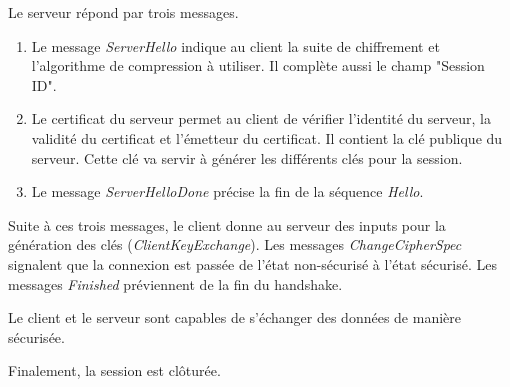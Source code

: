 Le serveur répond par trois messages.
\begin{enumerate}
	\item Le message \textit{ServerHello} indique au client la suite de chiffrement et l'algorithme de compression à utiliser. Il complète aussi le champ "Session ID". 
	\item Le certificat du serveur permet au client de vérifier l'identité du serveur, la validité du certificat et l'émetteur du certificat. Il contient la clé publique du serveur. Cette clé va servir à générer les différents clés pour la session.
	\item Le message \textit{ServerHelloDone} précise la fin de la séquence \textit{Hello}.
\end{enumerate}
Suite à ces trois messages, le client donne au serveur des inputs pour la génération des clés (\textit{ClientKeyExchange}).
Les messages \textit{ChangeCipherSpec} signalent que la connexion est passée de l'état non-sécurisé à l'état sécurisé. 
Les messages \textit{Finished} préviennent de la fin du handshake.
 
Le client et le serveur sont capables de s'échanger des données de manière sécurisée. 

Finalement, la session est clôturée.